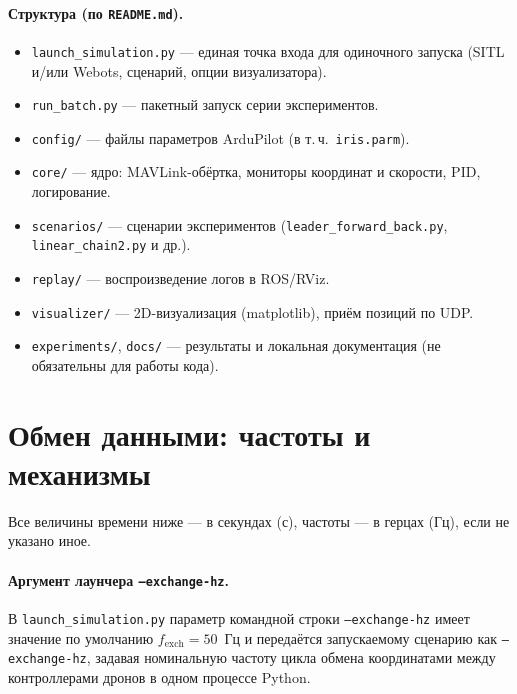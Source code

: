 \documentclass[12pt,a4paper]{article}
\begin{document}
\paragraph{Структура (по \texttt{README.md}).}
\begin{itemize}
  \item \texttt{launch\_simulation.py} --- единая точка входа для одиночного запуска (SITL и/или Webots, сценарий, опции визуализатора).
  \item \texttt{run\_batch.py} --- пакетный запуск серии экспериментов.
  \item \texttt{config/} --- файлы параметров ArduPilot (в т.\,ч.\ \texttt{iris.parm}).
  \item \texttt{core/} --- ядро: MAVLink-обёртка, мониторы координат и скорости, PID, логирование.
  \item \texttt{scenarios/} --- сценарии экспериментов (\texttt{leader\_forward\_back.py}, \texttt{linear\_chain2.py} и др.).
  \item \texttt{replay/} --- воспроизведение логов в ROS/RViz.
  \item \texttt{visualizer/} --- 2D-визуализация (matplotlib), приём позиций по UDP.
  \item \texttt{experiments/}, \texttt{docs/} --- результаты и локальная документация (не обязательны для работы кода).
\end{itemize}

\section{Обмен данными: частоты и механизмы}

Все величины времени ниже --- в секундах (с), частоты --- в герцах (Гц), если не указано иное.

\paragraph{Аргумент лаунчера \texttt{--exchange-hz}.}
В \texttt{launch\_simulation.py} параметр командной строки \texttt{--exchange-hz} имеет значение по умолчанию $f_{\mathrm{exch}} = 50$~Гц и передаётся запускаемому сценарию как \texttt{--exchange-hz}, задавая номинальную частоту цикла обмена координатами между контроллерами дронов в одном процессе Python.
\end{document}
